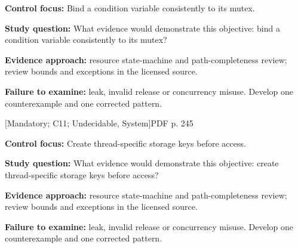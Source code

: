 \documentclass[10pt,letterpaper]{article}
\begin{document}
\textbf{Control focus:} Bind a condition variable consistently to its mutex.\par
\textbf{Study question:} What evidence would demonstrate this objective: bind a condition variable consistently to its mutex?\par
\textbf{Evidence approach:} resource state-machine and path-completeness review; review bounds and exceptions in the licensed source.\par
\textbf{Failure to examine:} leak, invalid release or concurrency misuse. Develop one counterexample and one corrected pattern.\par
\smallskip
{}
 \textsf{\footnotesize [Mandatory; C11; Undecidable, System]}\hfill{\footnotesize PDF p. 245}\par
\textbf{Control focus:} Create thread-specific storage keys before access.\par
\textbf{Study question:} What evidence would demonstrate this objective: create thread-specific storage keys before access?\par
\textbf{Evidence approach:} resource state-machine and path-completeness review; review bounds and exceptions in the licensed source.\par
\textbf{Failure to examine:} leak, invalid release or concurrency misuse. Develop one counterexample and one corrected pattern.\par
\smallskip
\end{document}
